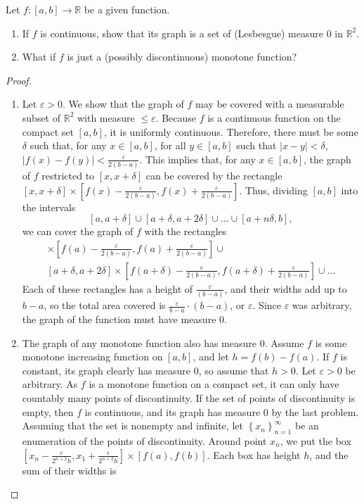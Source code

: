 \documentclass[12pt]{article}
\newcommand{\R}{\mathbb{R}}
\theoremstyle{definition}
\newenvironment{problem}[2][Problem]{\begin{trivlist}
\item[\hskip \labelsep {\bfseries #1}\hskip \labelsep {\bfseries #2.}]}{\end{trivlist}}
\begin{document}
\begin{problem}{3}
	Let $f: [a, b] \to \R$ be a given function. 
	\begin{enumerate}[label=(\roman*)]
		\item If $f$ is continuous, show that its graph is a set of (Lesbesgue) measure $0$ in $\R^2$.
		\item What if $f$ is just a (possibly discontinuous) monotone function?
	\end{enumerate}
	\begin{proof}
		\begin{enumerate}[label=(\roman*)]
			\item Let $\varepsilon > 0$. We show that the graph of $f$ may be covered with a measurable subset of $\R^2$ with measure $\leq \varepsilon$.
				Because $f$ is a continuous function on the compact set $[a,b]$, it is uniformly continuous. Therefore, there must be some $\delta$ such that, for any $x \in [a,b]$, for all $y \in [a,b]$ such that $\left \lvert { x-y } \right \lvert < \delta$, $\left \lvert { f(x) - f(y) } \right \lvert < \frac{\varepsilon}{2(b-a)}$. This implies that, for any $x \in [a,b]$, the graph of $f$ restricted to $[x, x+\delta]$ can be covered by the rectangle $[x, x + \delta] \times [f(x) - \frac{\varepsilon}{2(b-a)}, f(x) + \frac{\varepsilon}{2(b-a)}]$. Thus, dividing $[a,b]$ into the intervals
				\[ [a, a + \delta] \cup [a + \delta, a + 2\delta] \cup \dots \cup [a + n\delta, b],\]
				we can cover the graph of $f$ with the rectangles
				\begin{align*}[a, a + \delta] \times \left[f(a) - \frac{\varepsilon}{2(b-a)}, f(a) + \frac{\varepsilon}{2(b-a)}\right]\cup\\ [a + \delta, a + 2\delta] \times \left [f(a + \delta) - \frac{\varepsilon}{2(b-a)}, f(a+\delta) + \frac{\varepsilon}{2(b-a)} \right ]\cup \dots\end{align*}
				Each of these rectangles has a height of $\frac{\varepsilon}{(b-a)}$, and their widths add up to $b-a$, so the total area covered is $\frac{\varepsilon}{b-a} \cdot (b-a)$, or $\varepsilon$. Since $\varepsilon$ was arbitrary, the graph of the function must have measure $0$.
			\item The graph of any monotone function also has measure $0$. Assume $f$ is some monotone increasing function on $[a,b]$, and let $h = f(b) - f(a)$. If $f$ is constant, its graph clearly has measure $0$, so assume that $h > 0$. Let $\varepsilon > 0$ be arbitrary.
				As $f$ is a monotone function on a compact set, it can only have countably many points of discontinuity. If the set of points of discontinuity is empty, then $f$ is continuous, and its graph has measure $0$ by the last problem. Assuming that the set is nonempty and infinite, let $\left\{ x_n\right\}_{n=1}^\infty$ be an enumeration of the points of discontinuity. Around point $x_n$, we put the box $\left[ x_n - \frac{\varepsilon}{2^{n+2}h}, x_1 + \frac{\varepsilon}{2^{n+2}h} \right]\times [f(a), f(b)]$. Each box has height $h$, and the sum of their widths is

\end{enumerate}
\end{proof}
\end{problem}
\end{document}

